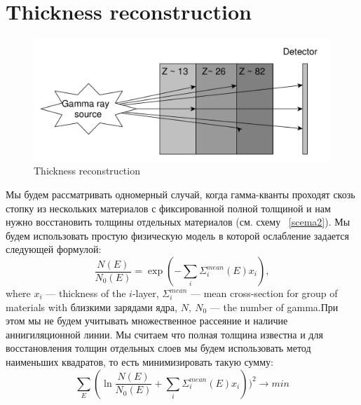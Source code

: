 \documentclass[a4paper]{panl}
\begin{document}
\section*{Thickness reconstruction}
\begin{figure} 
    \includegraphics[width=\linewidth]{figures/yed_schema_2.pdf}
    \vspace{-3mm}
    \caption{ Thickness reconstruction}
    \vspace{-5mm}
\end{figure}
Мы будем рассматривать одномерный случай, когда гамма-кванты проходят скозь стопку из нескольких материалов с фиксированной полной толщиной и нам нужно восстановить толщины отдельных материалов (см. схему ~\ref{scema2}). Мы будем использовать простую физическую модель в которой ослабление задается  следующей формулой: 
\begin{equation}
\label{eq:gamma}
\frac{N(E)}{N_0(E)} = \exp(-\sum_i \Sigma^{mean}_i(E)x_i),
\end{equation}
where $x_i$ --- thickness of the $i$-layer, $\Sigma^{mean}_i$ --- mean cross-section for group of materials with близкими зарядами ядра, $N,~N_0$ --- the number of gamma.При этом мы не будем учитывать множественное рассеяние и наличие аннигиляционной линии. Мы считаем что полная толщина известна и для восстановления толщин отдельных слоев мы будем использовать метод наименьших квадратов, то есть минимизировать такую сумму:
\begin{equation}
\sum_E(\ln \frac{N(E)}{N_0(E)} + \sum_i \Sigma^{mean}_i(E)x_i))^2 \to min
\end{equation}
\end{document}
